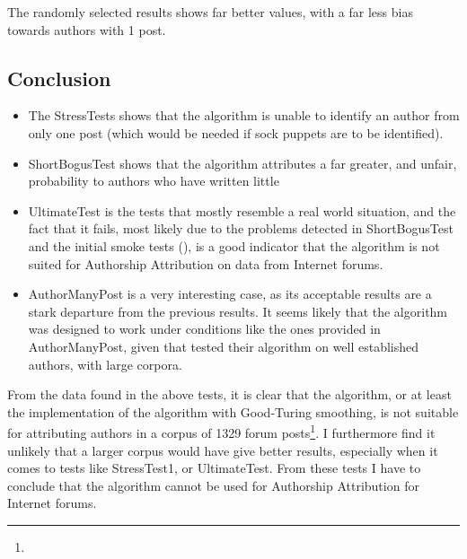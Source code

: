 The randomly selected results shows far better values, with a far less bias towards authors with 1 post. 

\subsection{Conclusion}
\begin{itemize}
\item The StressTests shows that the algorithm is unable to identify an author from only one post (which would be needed if sock puppets are to be identified). 
\item ShortBogusTest shows that the algorithm attributes a far greater, and unfair, probability to authors who have written little
\item UltimateTest is the tests that mostly resemble a real world situation, and the fact that it fails, most likely due to the problems detected in ShortBogusTest and the initial smoke tests (), is a good indicator that the algorithm is not suited for Authorship Attribution on data from Internet forums.
\item AuthorManyPost is a very interesting case, as its acceptable results are a stark departure from the previous results. It seems likely that the algorithm was designed to work under conditions like the ones provided in AuthorManyPost, given that \cite{nr4} tested their algorithm on well established authors, with large corpora.
\end{itemize}

From the data found in the above tests, it is clear that the algorithm, or at least the implementation of the algorithm with Good-Turing smoothing, is not suitable for attributing authors in a corpus of 1329 forum posts\footnote{}. I furthermore find it unlikely that a larger corpus would have give better results, especially when it comes to tests like StressTest1, or UltimateTest. From these tests I have to conclude that the algorithm cannot be used for Authorship Attribution for Internet forums.
